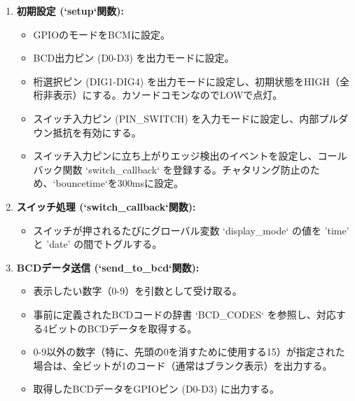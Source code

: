 \documentclass[a4paper,11pt,dvipdfmx]{jsarticle}
\begin{document}
\begin{enumerate}
    \item \textbf{初期設定 (`setup`関数):}
    \begin{itemize}
        \item GPIOのモードをBCMに設定。
        \item BCD出力ピン (D0-D3) を出力モードに設定。
        \item 桁選択ピン (DIG1-DIG4) を出力モードに設定し、初期状態をHIGH（全桁非表示）にする。カソードコモンなのでLOWで点灯。
        \item スイッチ入力ピン (PIN\_SWITCH) を入力モードに設定し、内部プルダウン抵抗を有効にする。
        \item スイッチ入力ピンに立ち上がりエッジ検出のイベントを設定し、コールバック関数 `switch\_callback` を登録する。チャタリング防止のため、`bouncetime`を300msに設定。
    \end{itemize}

    \item \textbf{スイッチ処理 (`switch\_callback`関数):}
    \begin{itemize}
        \item スイッチが押されるたびにグローバル変数 `display\_mode` の値を 'time' と 'date' の間でトグルする。
    \end{itemize}

    \item \textbf{BCDデータ送信 (`send\_to\_bcd`関数):}
    \begin{itemize}
        \item 表示したい数字（0-9）を引数として受け取る。
        \item 事前に定義されたBCDコードの辞書 `BCD\_CODES` を参照し、対応する4ビットのBCDデータを取得する。
        \item 0-9以外の数字（特に、先頭の0を消すために使用する15）が指定された場合は、全ビットが1のコード（通常はブランク表示）を出力する。
        \item 取得したBCDデータをGPIOピン (D0-D3) に出力する。
    \end{itemize}


\end{enumerate}
\end{document}
